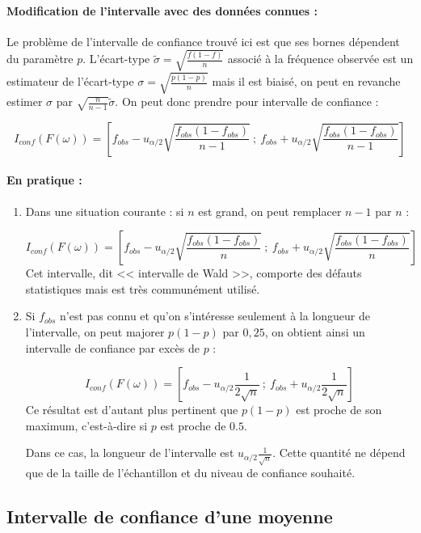 \paragraph{Modification de l'intervalle avec des données connues :}

Le problème de l'intervalle de confiance trouvé ici est que ses bornes dépendent du paramètre  $p$. L'écart-type $\tilde{\sigma}=\sqrt{\frac{f(1-f)}{n}}$ associé à la fréquence observée est un estimateur de l'écart-type $\sigma=\sqrt{\frac{p(1-p)}{n}}$ mais il est biaisé, on peut en revanche estimer $\sigma$ par $\sqrt{\frac{n}{n-1}}\tilde{\sigma}$. On peut donc prendre pour intervalle de confiance :

$$I_{conf}(F(\omega))=\left[f_{obs}-u_{\alpha/2} \sqrt{\frac{f_{obs}(1-f_{obs})}{n-1}} ~;~ f_{obs} + u_{\alpha/2} \sqrt{\frac{f_{obs}(1-f_{obs})}{n-1}} \right]$$

\paragraph{En pratique :} 
\begin{enumerate}
	\item Dans une situation courante : si $n$ est grand, on peut remplacer $n-1$ par $n$ :
	
	$$I_{conf}(F(\omega))=\left[f_{obs}-u_{\alpha/2} \sqrt{\frac{f_{obs}(1-f_{obs})}{n}} ~;~ f_{obs} + u_{\alpha/2} \sqrt{\frac{f_{obs}(1-f_{obs})}{n}} \right]$$
	Cet intervalle, dit << intervalle de Wald >>, comporte des défauts statistiques mais est très communément utilisé.
	\item  Si $f_{obs}$ n'est pas connu et qu'on s'intéresse seulement à la longueur de l'intervalle, on peut majorer $p(1-p)$ par $0{,}25$, on obtient ainsi un intervalle de confiance par excès de $p$ :
	
	$$I_{conf}(F(\omega))=\left[ f_{obs}-u_{\alpha/2} \frac{1}{2 \sqrt{n}} ~;~ f_{obs} + u_{\alpha/2} \frac{1}{2 \sqrt{n}} \right]$$
	Ce résultat est d'autant plus pertinent que $p(1-p)$ est proche de son maximum, c'est-à-dire si $p$ est proche de $0.5$.
	
	Dans ce cas, la longueur de l'intervalle est $u_{\alpha/2} \frac{1}{\sqrt{n}}$. Cette quantité ne dépend que de la taille de l'échantillon et du niveau de confiance souhaité. 
	
\end{enumerate}



\subsection{Intervalle de confiance d'une moyenne}
